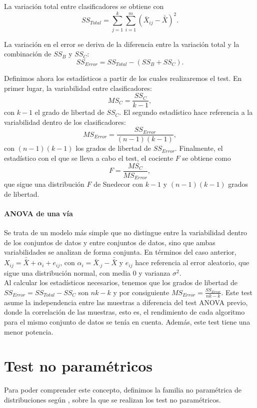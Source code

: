 	La variación total entre clasificadores se obtiene con
	\[
		SS_{Total} =  
			\sum\limits_{j=1}^k
				\sum\limits_{i=1}^m
					\left( \bar{X}_{ij} - 
						   \bar{\bar{X}} \right)^2.
	\]
			
	La variación en el error se deriva de la diferencia entre 
la variación total y la combinación de $SS_B$ y $SS_C$:
	\[
		SS_{Error} = SS_{Total} - (SS_B + SS_C).
	\]
	
	Definimos ahora los estadísticos a partir de los cuales 
realizaremos el test. En primer lugar, la variabilidad entre
clasificadores:
	\[
		MS_C = \frac{SS_C}{k-1},
	\]
	con $k-1$ el grado de libertad de $SS_C$. El segundo 
estadístico hace referencia a la variabilidad dentro de los 
clasificadores:
	\[
		MS_{Error} = \frac{SS_{Error}}{(n-1)(k-1)},
	\]
	con $(n-1)(k-1)$ los grados de libertad de $SS_{Error}$.
Finalmente, el estadístico con el que se lleva a cabo el
test, el cociente $F$ se obtiene como
	\[
		F = \frac{MS_C}{MS_{Error}},
	\]
	que sigue una distribución $F$ de Snedecor con $k-1$ y
$(n-1)(k-1)$ grados de libertad.

\paragraph{ANOVA de una vía} Se trata de un modelo más 
simple que no distingue entre la variabilidad dentro de los
conjuntos de datos y entre conjuntos de datos, sino que ambas
variabilidades se analizan de forma conjunta. En términos del
caso anterior, $X_{ij} = \bar{\bar{X}} + \alpha_i + e_{ij}$, 
con $\alpha_i = \bar{X}_{\cdot j} - \bar{\bar{X}}$ y $e_{ij}$
hace referencia al error aleatorio, que sigue una 
distribución normal, con media $0$ y varianza $\sigma^2$. \\
	Al calcular los estadísticos necesarios, tenemos que los 
grados de libertad de $SS_{Error} = SS_{Total} - SS_{C}$ son 
$nk-k$ y por consiguiente $MS_{Error} = \frac{SS_{Error}}
{nk-k}$. Este test asume la independencia entre las muestras
a diferencia del test ANOVA previo, donde la correlación de 
las muestras, esto es, el rendimiento de cada algoritmo para
el mismo conjunto de datos se tenía en cuenta. Además, este
test tiene una menor potencia.
	

\section{Test no paramétricos}

	Para poder comprender este concepto, definimos la familia 
no paramétrica de distribuciones según \cite{PESSAL10}, sobre 
la que se realizan los test no paramétricos. 
 
